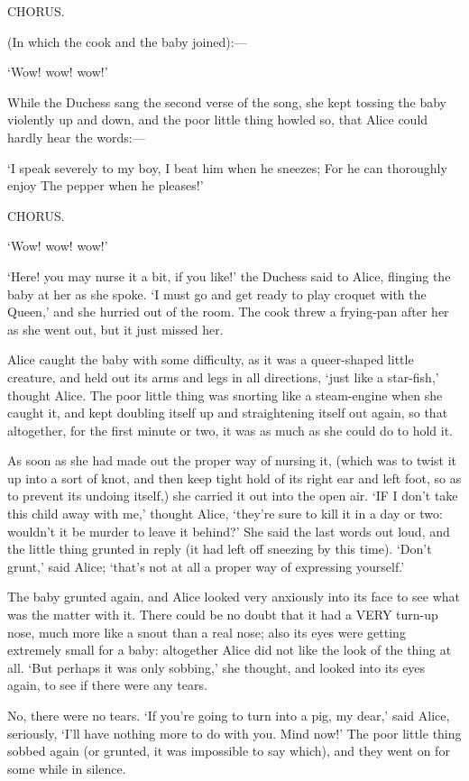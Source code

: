\documentclass[12pt]{book}
\begin{document}
\begin{Parallel}[p]{}{}
{         CHORUS.

 (In which the cook and the baby joined):—

       ‘Wow! wow! wow!’

While the Duchess sang the second verse of the song, she kept tossing the baby violently up and down, and the poor little thing howled so, that Alice could hardly hear the words:—

   ‘I speak severely to my boy,
    I beat him when he sneezes;
   For he can thoroughly enjoy
    The pepper when he pleases!’

         CHORUS.

       ‘Wow! wow! wow!’

‘Here! you may nurse it a bit, if you like!’ the Duchess said to Alice, flinging the baby at her as she spoke. ‘I must go and get ready to play croquet with the Queen,’ and she hurried out of the room. The cook threw a frying-pan after her as she went out, but it just missed her.

Alice caught the baby with some difficulty, as it was a queer-shaped little creature, and held out its arms and legs in all directions, ‘just like a star-fish,’ thought Alice. The poor little thing was snorting like a steam-engine when she caught it, and kept doubling itself up and straightening itself out again, so that altogether, for the first minute or two, it was as much as she could do to hold it.

As soon as she had made out the proper way of nursing it, (which was to twist it up into a sort of knot, and then keep tight hold of its right ear and left foot, so as to prevent its undoing itself,) she carried it out into the open air. ‘IF I don’t take this child away with me,’ thought Alice, ‘they’re sure to kill it in a day or two: wouldn’t it be murder to leave it behind?’ She said the last words out loud, and the little thing grunted in reply (it had left off sneezing by this time). ‘Don’t grunt,’ said Alice; ‘that’s not at all a proper way of expressing yourself.’

The baby grunted again, and Alice looked very anxiously into its face to see what was the matter with it. There could be no doubt that it had a VERY turn-up nose, much more like a snout than a real nose; also its eyes were getting extremely small for a baby: altogether Alice did not like the look of the thing at all. ‘But perhaps it was only sobbing,’ she thought, and looked into its eyes again, to see if there were any tears.

No, there were no tears. ‘If you’re going to turn into a pig, my dear,’ said Alice, seriously, ‘I’ll have nothing more to do with you. Mind now!’ The poor little thing sobbed again (or grunted, it was impossible to say which), and they went on for some while in silence.

}
\end{Parallel}
\end{document}
